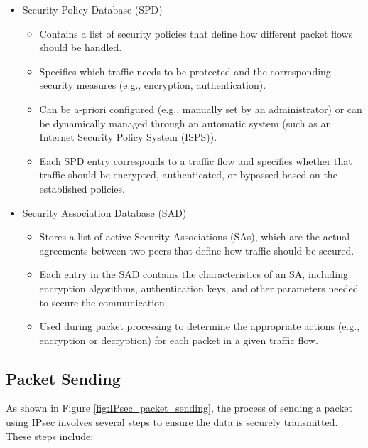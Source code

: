 \begin{itemize}
    \item Security Policy Database (SPD)
    \begin{itemize}
        \item Contains a list of security policies that define how different packet flows should be handled.
        \item Specifies which traffic needs to be protected and the corresponding security measures (e.g., encryption, authentication).
        \item Can be a-priori configured (e.g., manually set by an administrator) or can be dynamically managed through an automatic system (such as an Internet Security Policy System (ISPS)).
        \item Each SPD entry corresponds to a traffic flow and specifies whether that traffic should be encrypted, authenticated, or bypassed based on the established policies.
    \end{itemize}
    \item Security Association Database (SAD)
    \begin{itemize}
        \item Stores a list of active Security Associations (SAs), which are the actual agreements between two peers that define how traffic should be secured.
        \item Each entry in the SAD contains the characteristics of an SA, including encryption algorithms, authentication keys, and other parameters needed to secure the communication.
        \item Used during packet processing to determine the appropriate actions (e.g., encryption or decryption) for each packet in a given traffic flow.
    \end{itemize}
\end{itemize}

\subsection{Packet Sending}

As shown in Figure \ref{fig:IPsec_packet_sending}, the process of sending a packet using IPsec involves several steps to ensure the data is securely transmitted. These steps include:

